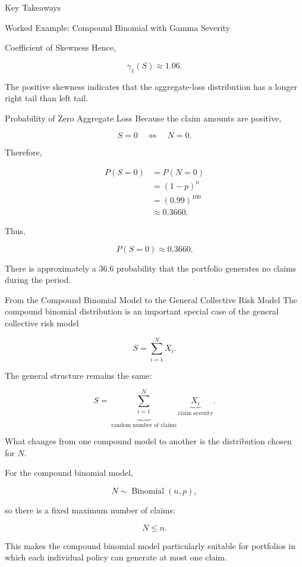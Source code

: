 \documentclass[
  ignorenonframetext,
  aspectratio=169,
]{beamer}
\begin{document}
\begin{frame}{Key Takeaways}
\begin{block}{Worked Example: Compound Binomial with Gamma Severity}
\begin{block}{Coefficient of Skewness}
Hence,

\[
\boxed{
\gamma_1(S)\approx1.06.
}
\]

The positive skewness indicates that the aggregate-loss distribution has
a longer right tail than left tail.
\end{block}

\begin{block}{Probability of Zero Aggregate Loss}
\protect{}\label{probability-of-zero-aggregate-loss-1}
Because the claim amounts are positive,

\[
S=0
\quad\Longleftrightarrow\quad
N=0.
\]

Therefore,

\[
\begin{aligned}
P(S=0)
&=P(N=0)\\
&=(1-p)^n\\
&=(0.99)^{100}\\
&\approx0.3660.
\end{aligned}
\]

Thus,

\[
\boxed{
P(S=0)\approx0.3660.
}
\]

There is approximately a \(36.6%
\) probability that the portfolio generates no claims during the period.
\end{block}
\end{block}

\begin{block}{From the Compound Binomial Model to the General Collective
Risk Model}
\protect{}\label{from-the-compound-binomial-model-to-the-general-collective-risk-model}
The compound binomial distribution is an important special case of the
general collective risk model

\[
S=\sum_{i=1}^{N}X_i.
\]

The general structure remains the same:

\[
\boxed{
S
=
\underbrace{\sum_{i=1}^{N}}_{\text{random number of claims}}
\underbrace{X_i}_{\text{claim severity}}.
}
\]

What changes from one compound model to another is the distribution
chosen for \(N\).

For the compound binomial model,

\[
N\sim\operatorname{Binomial}(n,p),
\]

so there is a fixed maximum number of claims:

\[
N\leq n.
\]

This makes the compound binomial model particularly suitable for
portfolios in which each individual policy can generate at most one
claim.


\end{block}
\end{frame}
\end{document}
